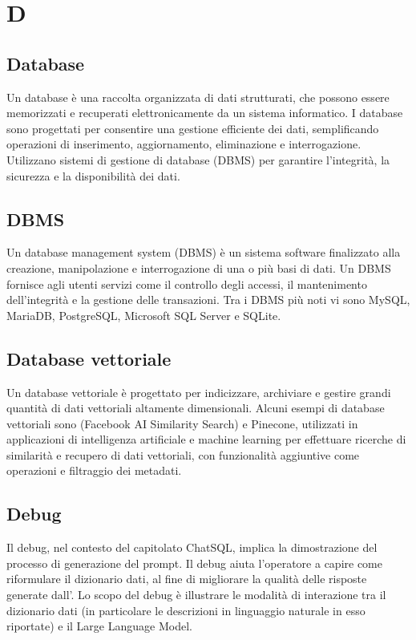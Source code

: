 \section{D}

\vspace{2em}
\subsection*{Database}
\par Un database è una raccolta organizzata di dati strutturati, che possono essere memorizzati e recuperati elettronicamente da un sistema informatico. I database sono progettati per consentire una gestione efficiente dei dati, semplificando operazioni di inserimento, aggiornamento, eliminazione e interrogazione. Utilizzano sistemi di gestione di database (DBMS) per garantire l'integrità, la sicurezza e la disponibilità dei dati.

\vspace{2em}
\subsection*{DBMS}
\par Un database management system (DBMS) è un sistema software finalizzato alla creazione, manipolazione e interrogazione di una o più basi di dati. Un DBMS fornisce agli utenti servizi come il controllo degli accessi, il mantenimento dell'integrità e la gestione delle transazioni. Tra i DBMS più noti vi sono MySQL, MariaDB, PostgreSQL, Microsoft SQL Server e SQLite.

\vspace{2em}
\subsection*{Database vettoriale}
\par Un database vettoriale è progettato per indicizzare, archiviare e gestire grandi quantità di dati vettoriali altamente dimensionali. Alcuni esempi di database vettoriali sono  (Facebook AI Similarity Search) e Pinecone, utilizzati in applicazioni di intelligenza artificiale e machine learning per effettuare ricerche di similarità e recupero di dati vettoriali, con funzionalità aggiuntive come operazioni  e filtraggio dei metadati.

\vspace{2em}
\subsection*{Debug}
\par Il debug, nel contesto del capitolato ChatSQL, implica la dimostrazione del processo di generazione del prompt. Il debug aiuta l'operatore a capire come riformulare il dizionario dati, al fine di migliorare la qualità delle risposte generate dall'. Lo scopo del debug è illustrare le modalità di interazione tra il dizionario dati (in particolare le descrizioni in linguaggio naturale in esso riportate) e il Large Language Model.

